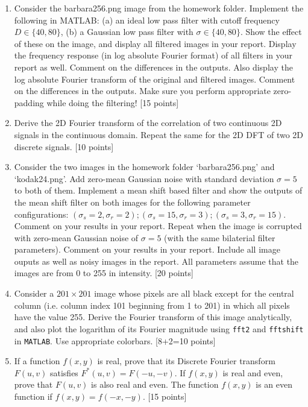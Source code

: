 \documentclass[11pt]{article}
\begin{document}
\begin{enumerate}
\item Consider the barbara256.png image from the homework folder. Implement the following in MATLAB: (a) an ideal low pass filter with cutoff frequency $D \in \{40, 80\}$, (b) a Gaussian low pass filter with $\sigma \in \{40,80\}$. Show the effect of these on the image, and display all filtered images in your report. Display the frequency response (in log absolute Fourier format) of all filters in your report as well. Comment on the differences in the outputs. Also display the log absolute Fourier transform of the original and filtered images. Comment on the differences in the outputs. Make sure you perform appropriate zero-padding while doing the filtering! \textsf{[15 points]}

\item Derive the 2D Fourier transform of the correlation of two continuous 2D signals in the continuous domain. Repeat the same for the 2D DFT of two 2D discrete signals. \textsf{[10 points]}

\item Consider the two images in the homework folder `barbara256.png' and `kodak24.png'. Add zero-mean Gaussian noise with standard deviation $\sigma = 5$ to both of them. Implement a mean shift based filter and show the outputs of the mean shift filter on both images for the following parameter configurations: $(\sigma_s = 2, \sigma_r = 2); (\sigma_s = 15, \sigma_r = 3); (\sigma_s = 3, \sigma_r = 15)$. Comment on your results in your report. Repeat when the image is corrupted with zero-mean Gaussian noise of $\sigma = 5$ (with the same bilaterial filter parameters). Comment on your results in your report. Include all image ouputs as well as noisy images in the report. All parameters assume that the images are from 0 to 255 in intensity. \textsf{[20 points]}

\item Consider a $201 \times 201$ image whose pixels are all black except for the central column (i.e. column index 101 beginning from 1 to 201) in which all pixels have the value 255. Derive the Fourier transform of this image analytically, and also plot the logarithm of its Fourier magnitude using \texttt{fft2} and \texttt{fftshift} in \texttt{MATLAB}. Use appropriate colorbars.  
\textsf{[8+2=10 points]}

\item If a function $f(x,y)$ is real, prove that its Discrete Fourier transform $F(u,v)$ satisfies $F^*(u,v) = F(-u,-v)$. If $f(x,y)$ is real and even, prove that $F(u,v)$ is also real and even. The function $f(x,y)$ is an even function if $f(x,y) = f(-x,-y)$. \textsf{[15 points]}


\end{enumerate}
\end{document}
